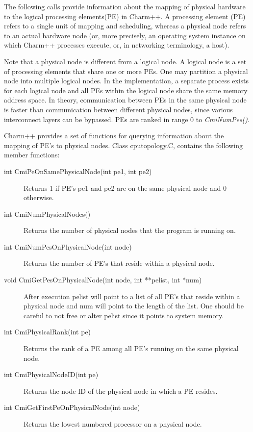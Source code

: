 
The following calls provide information about the mapping of physical hardware to
 the logical processing elements(PE) in Charm++.
A processing element (PE) refers to a single unit of mapping and scheduling,
whereas a physical node refers to an actual hardware node 
(or, more precisely, an operating system instance on which Charm++ processes execute,
 or, in networking terminology, a host).


Note that a physical node is different from a logical node. A logical node is a set of processing elements that share
one or more PEs. One may partition a physical node into multiple logical nodes.
In the implementation, a separate process exists for each logical node and all PEs within the logical node
 share the same memory address space.
In theory, communication between PEs in the same physical node is faster than communication
 between different physical nodes, since various interconnect layers can be bypassed.
PEs are ranked in range 0 to {\em CmiNumPes()}.


Charm++ provides a set of functions for querying information about the mapping of PE's to physical nodes. 
 Class cputopology.C, contains the following member functions:


\begin{description}
\item [int CmiPeOnSamePhysicalNode(int pe1, int pe2)] Returns 1 if PE's pe1 and pe2 are on the same physical node and 0 otherwise.

\item [int CmiNumPhysicalNodes()] Returns the number of physical nodes that the program is running on.

\item [int CmiNumPesOnPhysicalNode(int node)] Returns the number of PE's  that reside within a physical node.

\item [void CmiGetPesOnPhysicalNode(int node, int **pelist, int *num)] After execution pelist will point to a 
list of all PE's that reside within a physical node and num will point to the length of the list. One should be careful
to not free or alter pelist since it points to system memory.

\item [int CmiPhysicalRank(int pe)] Returns the rank of a PE among all PE's running on the same physical node.

\item [int CmiPhysicalNodeID(int pe)] Returns the node ID of the physical node in which a PE resides.

\item [int CmiGetFirstPeOnPhysicalNode(int node)]  Returns the lowest numbered processor on a physical node.
\end{description}






